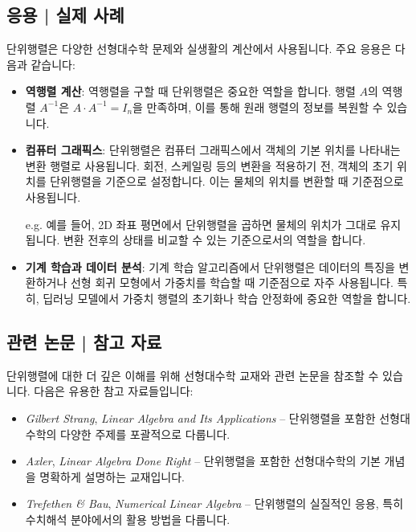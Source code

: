 \subsection{응용 | 실제 사례}
단위행렬은 다양한 선형대수학 문제와 실생활의 계산에서 사용됩니다. 주요 응용은 다음과 같습니다:

\begin{itemize}
  \item \textbf{역행렬 계산}: 역행렬을 구할 때 단위행렬은 중요한 역할을 합니다. 행렬 \(A\)의 역행렬 \(A^{-1}\)은 \(A \cdot A^{-1} = I_n\)을 만족하며, 이를 통해 원래 행렬의 정보를 복원할 수 있습니다.

  \item \textbf{컴퓨터 그래픽스}: 단위행렬은 컴퓨터 그래픽스에서 객체의 기본 위치를 나타내는 변환 행렬로 사용됩니다. 회전, 스케일링 등의 변환을 적용하기 전, 객체의 초기 위치를 단위행렬을 기준으로 설정합니다. 이는 물체의 위치를 변환할 때 기준점으로 사용됩니다.

        \vspace{1\baselineskip}
        \noindent {} e.g. 예를 들어, 2D 좌표 평면에서 단위행렬을 곱하면 물체의 위치가 그대로 유지됩니다. 변환 전후의 상태를 비교할 수 있는 기준으로서의 역할을 합니다.

  \item \textbf{기계 학습과 데이터 분석}: 기계 학습 알고리즘에서 단위행렬은 데이터의 특징을 변환하거나 선형 회귀 모형에서 가중치를 학습할 때 기준점으로 자주 사용됩니다. 특히, 딥러닝 모델에서 가중치 행렬의 초기화나 학습 안정화에 중요한 역할을 합니다.
\end{itemize}

\subsection{관련 논문 | 참고 자료}
단위행렬에 대한 더 깊은 이해를 위해 선형대수학 교재와 관련 논문을 참조할 수 있습니다. 다음은 유용한 참고 자료들입니다:

\begin{itemize}
  \item \textit{Gilbert Strang}, \textit{Linear Algebra and Its Applications} – 단위행렬을 포함한 선형대수학의 다양한 주제를 포괄적으로 다룹니다.
  \item \textit{Axler}, \textit{Linear Algebra Done Right} – 단위행렬을 포함한 선형대수학의 기본 개념을 명확하게 설명하는 교재입니다.
  \item \textit{Trefethen \& Bau}, \textit{Numerical Linear Algebra} – 단위행렬의 실질적인 응용, 특히 수치해석 분야에서의 활용 방법을 다룹니다.
\end{itemize}
